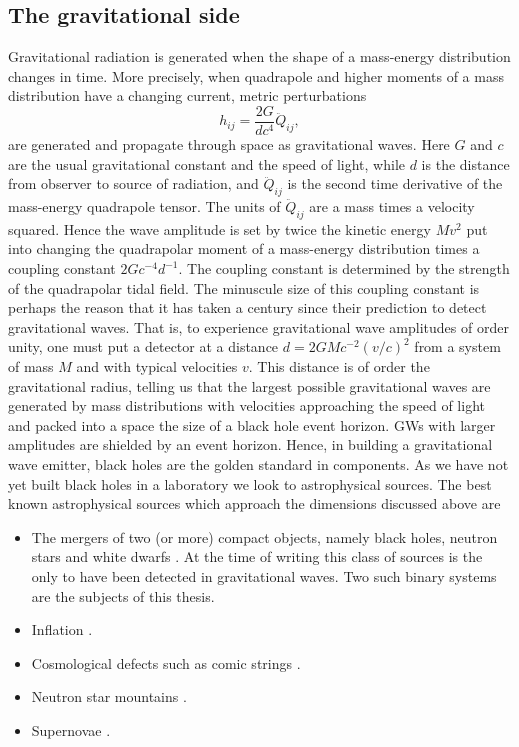 \subsection{The gravitational side}
Gravitational radiation is generated when the shape of a mass-energy distribution changes in time. More precisely, when quadrapole and higher moments of a mass distribution have a changing current, metric perturbations
\begin{equation}
h_{i j} = \frac{2G}{d c^4} \ddot{Q}_{ij},
\end{equation}
are generated and propagate through space as gravitational waves. Here $G$ and $c$ are the usual gravitational constant and the speed of light, while $d$ is the distance from observer to source of radiation, and $ \ddot{Q}_{ij}$ is the second time derivative of the mass-energy quadrapole tensor. The units of $\ddot{Q}_{ij}$ are a mass times a velocity squared. Hence the wave amplitude is set by twice the kinetic energy $M v^2$ put into changing the quadrapolar moment of a mass-energy distribution times a coupling constant $2 Gc^{-4}d^{-1}$. The coupling constant is determined by the strength of the quadrapolar tidal field. The minuscule size of this coupling constant is perhaps the reason that it has taken a century since their prediction to detect gravitational waves. That is, to experience gravitational wave amplitudes of order unity, one must put a detector at a distance $d= 2GMc^{-2} (v/c)^2$ from a system of mass $M$ and with typical velocities $v$. This distance is of order the gravitational radius, telling us that the largest possible gravitational waves are generated by mass distributions with velocities approaching the speed of light and packed into a space the size of a black hole event horizon. GWs with larger amplitudes are shielded by an event horizon. Hence, in building a gravitational wave emitter, black holes are the golden standard in components. As we have not yet built black holes in a laboratory we look to astrophysical sources. The best known astrophysical sources which approach the dimensions discussed above are
\begin{itemize}
\item The mergers of two (or more) compact objects, namely black holes, neutron stars and white dwarfs \citep{}. At the time of writing this class of sources is the only to have been detected in gravitational waves\citep{GW091415}. Two such binary systems are the subjects of this thesis.
\item Inflation \citep[\textit{e.g.}][]{Guzzatti:2016}.
\item Cosmological defects such as comic strings  \citep[\textit{e.g.}][]{}.
\item Neutron star mountains  \citep[\textit{e.g.}][]{}.
\item Supernovae  \citep[\textit{e.g.}][]{}.
\end{itemize}



